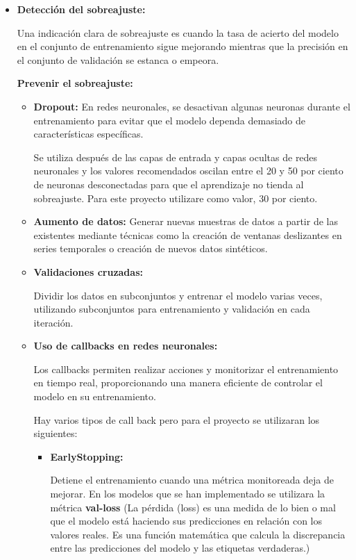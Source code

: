 \begin{itemize}	
\item
\textbf{Detección del sobreajuste:}

	Una indicación clara de sobreajuste es cuando la tasa de acierto del modelo en el conjunto de entrenamiento sigue mejorando mientras que la precisión en el conjunto de validación se estanca o empeora.

\textbf{Prevenir el sobreajuste:}

	\begin{itemize}
	\item
	\textbf{Dropout:}
	En redes neuronales, se desactivan algunas neuronas durante el entrenamiento para evitar que el modelo dependa demasiado de características específicas.
	
	Se utiliza después de las capas de entrada y capas ocultas de redes neuronales y los valores recomendados oscilan entre el 20 y 50 por ciento de neuronas desconectadas para que el aprendizaje no tienda al sobreajuste. Para este proyecto utilizare como valor, 30 por ciento.
	
	\item
	\textbf{Aumento de datos:}
	Generar nuevas muestras de datos a partir de las existentes mediante técnicas como la creación de ventanas deslizantes en series temporales o creación de nuevos datos sintéticos.
	
	\item
	\textbf{Validaciones cruzadas:}
	
	Dividir los datos en subconjuntos y entrenar el modelo varias veces, utilizando subconjuntos para entrenamiento y validación en cada iteración.
	
	\item
	\textbf{Uso de callbacks en redes neuronales:}
	
	Los callbacks permiten realizar acciones y monitorizar el entrenamiento en tiempo real, proporcionando una manera eficiente de controlar el modelo en su entrenamiento.
	
	Hay varios tipos de call back pero para el proyecto se utilizaran los siguientes:
	
		\begin{itemize}
		\item
		\textbf{EarlyStopping:}
	
	Detiene el entrenamiento cuando una métrica monitoreada deja de mejorar. En los modelos que se han implementado se utilizara la métrica \textbf{val-loss} (La pérdida (loss) es una medida de lo bien o mal que el modelo está haciendo sus predicciones en relación con los valores reales. Es una función matemática que calcula la discrepancia entre las predicciones del modelo y las etiquetas verdaderas.)
	

\end{itemize}
\end{itemize}
\end{itemize}
